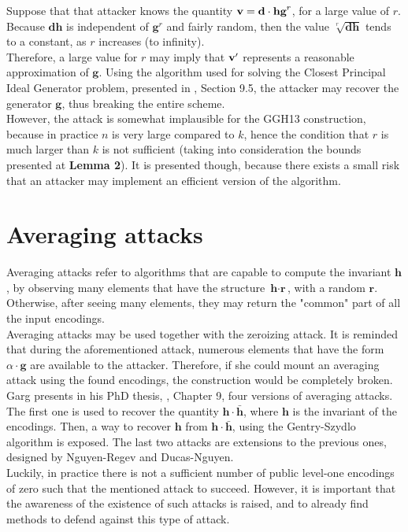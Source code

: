 Suppose that that attacker knows the quantity $\textbf{v} = \textbf{d} \cdot \textbf{hg}^r$, for a large value of $r$. Because $\textbf{dh}$ is independent of $\textbf{g}^r$ and fairly random, then the value $\sqrt[r]{\textbf{dh}}$ tends to a constant, as $r$ increases (to infinity).\\

 Therefore, a large value for $r$ may imply that $\textbf{v}'$ represents a reasonable approximation of $\textbf{g}$. Using the algorithm used for solving the Closest Principal Ideal Generator problem, presented in \cite{Gar15}, Section 9.5, the attacker may recover the generator $\textbf{g}$, thus breaking the entire scheme.\\
 
 However, the attack is somewhat implausible for the GGH13 construction, because in practice $n$ is very large compared to $k$, hence the condition that $r$ is much larger than $k$ is not sufficient (taking into consideration the bounds presented at \textbf{Lemma 2}). It is presented though, because there exists a small risk that an attacker may implement an efficient version of the algorithm.
 
 \section{Averaging attacks}
 
 Averaging attacks refer to algorithms that are capable to compute the invariant $\textbf{h}$, by observing many elements that have the structure $\textbf{h} \cdot \textbf{r}$, with a random $\textbf{r}$. Otherwise, after seeing many elements, they may return the "common" part of all the input encodings. \\
 
 Averaging attacks may be used together with the zeroizing attack. It is reminded that during the aforementioned attack, numerous elements that have the form $\alpha \cdot \textbf{g}$ are available to the attacker. Therefore, if she could mount an averaging attack using the found encodings, the construction would be completely broken.\\
 
 Garg presents in his PhD thesis, \cite{Gar15}, Chapter 9, four versions of averaging attacks. The first one is used to recover the quantity $\textbf{h} \cdot \bar{\textbf{h}}$, where $\textbf{h}$ is the invariant of the encodings. Then, a way to recover $\textbf{h}$ from $\textbf{h} \cdot \bar{\textbf{h}}$, using the Gentry-Szydlo algorithm is exposed. The last two attacks are extensions to the previous ones, designed by Nguyen-Regev and Ducas-Nguyen. \\ 
 
 Luckily, in practice there is not a sufficient number of public level-one encodings of zero such that the mentioned attack to succeed. However, it is important that the awareness of the existence of such attacks is raised, and to already find methods to defend against this type of attack.
 